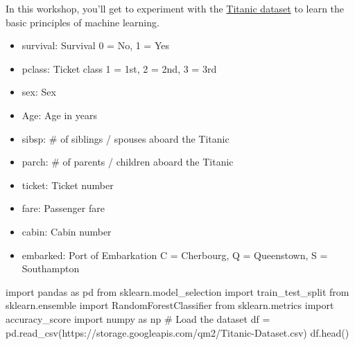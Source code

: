 \documentclass[
  letterpaper,
  DIV=11,
  numbers=noendperiod]{scrreprt}
\newenvironment{Shaded}{\begin{snugshade}}{\end{snugshade}}
\newcommand{\CommentTok}[1]{\textcolor[rgb]{0.37,0.37,0.37}{#1}}
\newcommand{\ImportTok}[1]{\textcolor[rgb]{0.00,0.46,0.62}{#1}}
\newcommand{\NormalTok}[1]{\textcolor[rgb]{0.00,0.23,0.31}{#1}}
\newcommand{\OperatorTok}[1]{\textcolor[rgb]{0.37,0.37,0.37}{#1}}
\newcommand{\StringTok}[1]{\textcolor[rgb]{0.13,0.47,0.30}{#1}}
\providecommand{\tightlist}{%
  \setlength{\itemsep}{0pt}\setlength{\parskip}{0pt}}\usepackage{longtable,booktabs,array}
\begin{document}
In this workshop, you'll get to experiment with the
\href{https://www.kaggle.com/c/titanic/data}{Titanic dataset} to learn
the basic principles of machine learning.

\begin{itemize}
\tightlist
\item
  survival: Survival 0 = No, 1 = Yes
\item
  pclass: Ticket class 1 = 1st, 2 = 2nd, 3 = 3rd
\item
  sex: Sex
\item
  Age: Age in years\\
\item
  sibsp: \# of siblings / spouses aboard the Titanic\\
\item
  parch: \# of parents / children aboard the Titanic\\
\item
  ticket: Ticket number\\
\item
  fare: Passenger fare\\
\item
  cabin: Cabin number\\
\item
  embarked: Port of Embarkation C = Cherbourg, Q = Queenstown, S =
  Southampton
\end{itemize}

\begin{Shaded}
\begin{Highlighting}[]
\ImportTok{import}\NormalTok{ pandas }\ImportTok{as}\NormalTok{ pd}
\ImportTok{from}\NormalTok{ sklearn.model\_selection }\ImportTok{import}\NormalTok{ train\_test\_split}
\ImportTok{from}\NormalTok{ sklearn.ensemble }\ImportTok{import}\NormalTok{ RandomForestClassifier}
\ImportTok{from}\NormalTok{ sklearn.metrics }\ImportTok{import}\NormalTok{ accuracy\_score}
\ImportTok{import}\NormalTok{ numpy }\ImportTok{as}\NormalTok{ np}
\CommentTok{\# Load the dataset}
\NormalTok{df }\OperatorTok{=}\NormalTok{ pd.read\_csv(}\StringTok{\textquotesingle{}https://storage.googleapis.com/qm2/Titanic{-}Dataset.csv\textquotesingle{}}\NormalTok{)}
\NormalTok{df.head()}
\end{Highlighting}
\end{Shaded}
\end{document}
